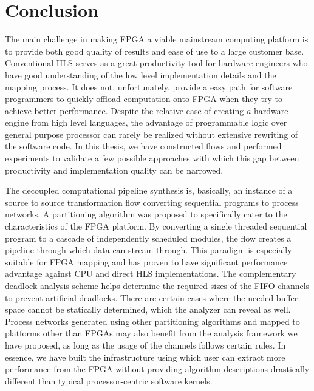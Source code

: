 \chapter{Conclusion}
\label{concluChap}

The main challenge in making FPGA a viable mainstream computing platform is to provide both good quality of results and ease of
use to a large customer base. Conventional HLS serves as a great
productivity tool for hardware engineers who have good understanding of the low level implementation details and the mapping process. It does not, unfortunately, provide a easy path for software programmers to quickly offload computation onto FPGA when they try to achieve better performance. Despite the relative ease of creating $a$ hardware engine from high level languages, the advantage of programmable logic over general purpose processor can
rarely be realized without extensive rewriting of the software code. In this thesis, we have constructed flows and performed experiments to validate a few possible approaches with which this gap between productivity and implementation quality can be narrowed.

The decoupled computational pipeline synthesis is, basically, an  instance of a source to source transformation flow converting sequential programs to process networks. A partitioning algorithm was proposed to specifically cater to the characteristics of the FPGA platform. By converting a single threaded sequential program to a cascade of independently scheduled modules, the flow creates a pipeline through which data can stream through. This paradigm is especially suitable for FPGA
mapping and has proven to have significant performance advantage against CPU and direct HLS implementations.
The complementary deadlock analysis scheme helps determine the required sizes of the FIFO channels to prevent artificial deadlocks. There are certain cases where the needed buffer space cannot be statically determined, which the analyzer can reveal as well. Process networks generated using other partitioning algorithms and mapped to platforms other than FPGAs may also
benefit from the analysis framework we have proposed, as long as the usage of the channels follows certain rules. In essence, we
have built the infrastructure using which user can extract more
performance from the FPGA without providing algorithm descriptions
drastically different than typical processor-centric software kernels. 

